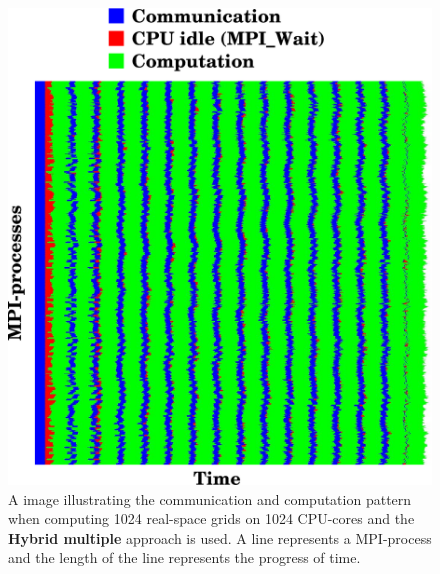 \documentclass[conference]{IEEEtran}
\begin{document}
\begin{figure}
 \centering
 \includegraphics[width=\linewidth]{gfx/prof}
 \caption{A image illustrating the communication and computation pattern when computing 1024 real-space grids on 1024 CPU-cores and the \textbf{Hybrid multiple} approach is used. A line represents a MPI-process and the length of the line represents the progress of time.}
 \label{fig:prof}
\end{figure}




%
%
\end{document}
